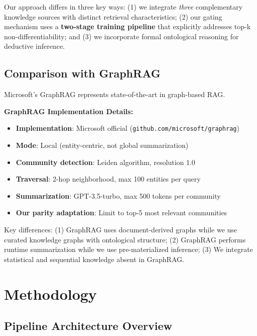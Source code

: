 \documentclass[10pt,twocolumn]{article}
\begin{document}
Our approach differs in three key ways: (1) we integrate \textit{three} complementary knowledge sources with distinct retrieval characteristics; (2) our gating mechanism uses a \textbf{two-stage training pipeline} that explicitly addresses top-k non-differentiability; and (3) we incorporate formal ontological reasoning for deductive inference.

\subsection{Comparison with GraphRAG}
\label{sec:graphrag}

Microsoft's GraphRAG \cite{edge2024graphrag,microsoft2024graphrag} represents state-of-the-art in graph-based RAG.

\textbf{GraphRAG Implementation Details:}
\begin{itemize}
    \item \textbf{Implementation}: Microsoft official (\texttt{github.com/microsoft/graphrag})
    \item \textbf{Mode}: Local (entity-centric, not global summarization)
    \item \textbf{Community detection}: Leiden algorithm, resolution 1.0
    \item \textbf{Traversal}: 2-hop neighborhood, max 100 entities per query
    \item \textbf{Summarization}: GPT-3.5-turbo, max 500 tokens per community
    \item \textbf{Our parity adaptation}: Limit to top-5 most relevant communities
\end{itemize}

Key differences: (1) GraphRAG uses document-derived graphs while we use curated knowledge graphs with ontological structure; (2) GraphRAG performs runtime summarization while we use pre-materialized inference; (3) We integrate statistical and sequential knowledge absent in GraphRAG.

\section{Methodology}
\label{sec:method}

\subsection{Pipeline Architecture Overview}
\label{sec:pipeline}
\end{document}
